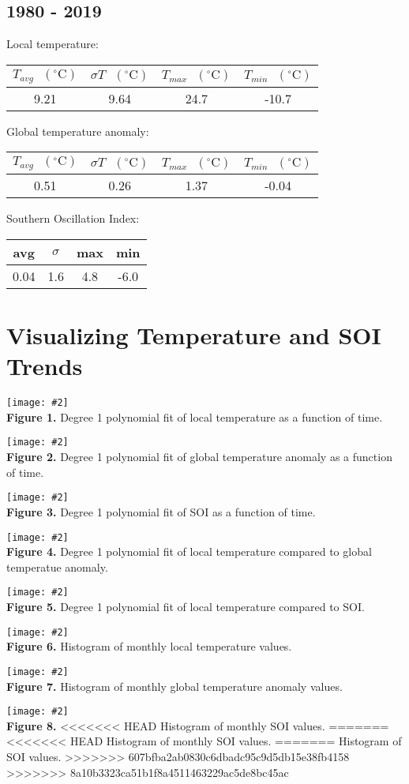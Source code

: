 \documentclass[12pt]{article}
\newcommand{\img}[4]{
 \begin{center}
 \texttt{[image: \#2]} \\
 \textbf{Figure #3.} #4
 \end{center}
}
\begin{document}
\subsection*{1980 - 2019}
Local temperature:
\begin{center}
\begin{tabular}{c | c | c | c}
 $T_{avg} \textrm{ } (^{\circ} \textrm{C})$ &
 $\sigma T \textrm{ } (^{\circ} \textrm{C})$ &
 $T_{max} \textrm{ } (^{\circ} \textrm{C})$ &
 $T_{min} \textrm{ } (^{\circ} \textrm{C})$ \\ %
 \hline
 9.21 & 9.64 & 24.7 & -10.7 \\ %
\end{tabular}
\end{center}
Global temperature anomaly:
\begin{center}
\begin{tabular}{c | c | c | c}
 $T_{avg} \textrm{ } (^{\circ} \textrm{C})$ &
 $\sigma T \textrm{ } (^{\circ} \textrm{C})$ &
 $T_{max} \textrm{ } (^{\circ} \textrm{C})$ &
 $T_{min} \textrm{ } (^{\circ} \textrm{C})$ \\ %
 \hline
 0.51 & 0.26 & 1.37 & -0.04 \\ %
\end{tabular}
\end{center}
Southern Oscillation Index:
\begin{center}
\begin{tabular}{c | c | c | c}
 avg & $\sigma$ & max & min \\ %
 \hline
 0.04 & 1.6 & 4.8 & -6.0 \\ %
\end{tabular}
\end{center}

\section*{Visualizing Temperature and SOI Trends}
\img{0.65}{../plots/fits/local.png}{1}{
 Degree 1 polynomial fit of local temperature as a
 function of time.
}
\img{0.65}{../plots/fits/global.png}{2}{
 Degree 1 polynomial fit of global temperature anomaly as a
 function of time.
}
\img{0.65}{../plots/fits/soi.png}{3}{
 Degree 1 polynomial fit of SOI as a
 function of time.
}
\img{0.65}{../plots/compare/local_vs_global.png}{4}{
 Degree 1 polynomial fit of local temperature compared
 to global temperatue anomaly.
}
\img{0.65}{../plots/compare/local_vs_soi.png}{5}{
 Degree 1 polynomial fit of local temperature compared
 to SOI.
}
\img{0.65}{../plots/histogram/local.png}{6}{
 Histogram of monthly local temperature values.
}
\img{0.65}{../plots/histogram/global.png}{7}{
 Histogram of monthly global temperature anomaly values.
}
\img{0.65}{../plots/histogram/soi.png}{8}{
<<<<<<< HEAD
 Histogram of monthly SOI values.
=======
<<<<<<< HEAD
 Histogram of monthly SOI values.
=======
 Histogram of SOI values.
>>>>>>> 607bfba2ab0830c6dbadc95c9d5db15e38fb4158
>>>>>>> 8a10b3323ca51b1f8a4511463229ac5de8bc45ac
}
\end{document}
